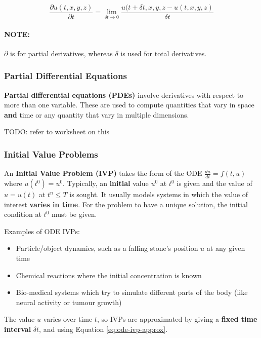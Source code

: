 \documentclass{article}
\begin{document}
\begin{equation}
	\frac{\partial u(t, x, y, z)}{\partial t} = \lim_{\delta t \rightarrow 0} \frac{u(t + \delta t, x, y, z - u(t, x, y, z)}{\delta t}
	\label{eq:partial-derivative}
\end{equation}

\paragraph{\textbf{NOTE: }} $\partial$ is for partial derivatives, whereas $\delta$ is used for total derivatives.

\subsubsection{Partial Differential Equations}

\textbf{Partial differential equations (PDEs)} involve derivatives with respect to more than one variable. These are used to compute quantities that vary in space \textbf{and} time or any quantity that vary in multiple dimensions.

TODO: refer to worksheet on this

\subsubsection{Initial Value Problems}

An \textbf{Initial Value Problem (IVP)} takes the form of the ODE $\frac{du}{dt} = f(t, u)$ where $u(t^0) = u^0$. Typically, an \textbf{initial} value $u^0$ at $t^0$ is given and the value of $u = u(t)$ at $t^n \leq T$ is sought. It usually models systems in which the value of interest \textbf{varies in time}. For the problem to have a unique solution, the initial condition at $t^0$ must be given.

Examples of ODE IVPs:
\begin{itemize}
	\item Particle/object dynamics, such as a falling stone's position $u$ at any given time
	\item Chemical reactions where the initial concentration is known
	\item Bio-medical systems which try to simulate different parts of the body (like neural activity or tumour growth)
\end{itemize}

The value $u$ varies over time $t$, so IVPs are approximated by giving a \textbf{fixed time interval} $\delta t$, and using Equation \ref{eq:ode-ivp-approx}. 
\end{document}

